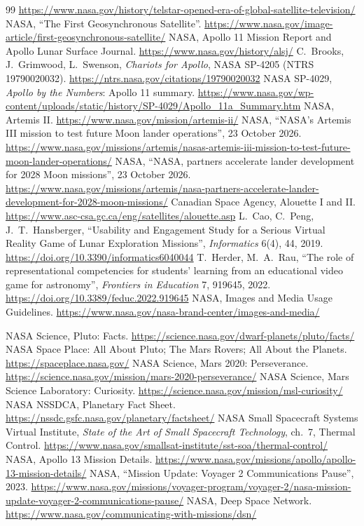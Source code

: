 \documentclass[11pt,a4paper]{article}
\begin{document}
\begin{thebibliography}{99}
  \url{https://www.nasa.gov/history/telstar-opened-era-of-global-satellite-television/}
 NASA, ``The First Geosynchronous Satellite''. \url{https://www.nasa.gov/image-article/first-geosynchronous-satellite/}
 NASA, Apollo 11 Mission Report and Apollo Lunar Surface Journal. \url{https://www.nasa.gov/history/alsj/}
 C.~Brooks, J.~Grimwood, L.~Swenson, \emph{Chariots for Apollo}, NASA SP-4205 (NTRS 19790020032).
  \url{https://ntrs.nasa.gov/citations/19790020032}
 NASA SP-4029, \emph{Apollo by the Numbers}: Apollo 11 summary.
  \url{https://www.nasa.gov/wp-content/uploads/static/history/SP-4029/Apollo_11a_Summary.htm}
 NASA, Artemis II. \url{https://www.nasa.gov/mission/artemis-ii/}
 NASA, ``NASA's Artemis III mission to test future Moon lander operations'', 23 October 2026.
  \url{https://www.nasa.gov/missions/artemis/nasas-artemis-iii-mission-to-test-future-moon-lander-operations/}
 NASA, ``NASA, partners accelerate lander development for 2028 Moon missions'', 23 October 2026.
  \url{https://www.nasa.gov/missions/artemis/nasa-partners-accelerate-lander-development-for-2028-moon-missions/}
 Canadian Space Agency, Alouette I and II. \url{https://www.asc-csa.gc.ca/eng/satellites/alouette.asp}
 L.~Cao, C.~Peng, J.~T.~Hansberger, ``Usability and Engagement Study for a Serious Virtual Reality Game of Lunar Exploration Missions'', \emph{Informatics} 6(4), 44, 2019.
  \url{https://doi.org/10.3390/informatics6040044}
 T.~Herder, M.~A.~Rau, ``The role of representational competencies for students' learning from an educational video game for astronomy'', \emph{Frontiers in Education} 7, 919645, 2022.
  \url{https://doi.org/10.3389/feduc.2022.919645}
 NASA, Images and Media Usage Guidelines. \url{https://www.nasa.gov/nasa-brand-center/images-and-media/}

 NASA Science, Pluto: Facts. \url{https://science.nasa.gov/dwarf-planets/pluto/facts/}
 NASA Space Place: All About Pluto; The Mars Rovers; All About the Planets. \url{https://spaceplace.nasa.gov/}
 NASA Science, Mars 2020: Perseverance. \url{https://science.nasa.gov/mission/mars-2020-perseverance/}
 NASA Science, Mars Science Laboratory: Curiosity. \url{https://science.nasa.gov/mission/msl-curiosity/}
 NASA NSSDCA, Planetary Fact Sheet. \url{https://nssdc.gsfc.nasa.gov/planetary/factsheet/}
 NASA Small Spacecraft Systems Virtual Institute, \emph{State of the Art of Small Spacecraft Technology}, ch.~7, Thermal Control.
  \url{https://www.nasa.gov/smallsat-institute/sst-soa/thermal-control/}
 NASA, Apollo 13 Mission Details. \url{https://www.nasa.gov/missions/apollo/apollo-13-mission-details/}
 NASA, ``Mission Update: Voyager 2 Communications Pause'', 2023.
  \url{https://www.nasa.gov/missions/voyager-program/voyager-2/nasa-mission-update-voyager-2-communications-pause/}
 NASA, Deep Space Network. \url{https://www.nasa.gov/communicating-with-missions/dsn/}
\end{thebibliography}
\end{document}

